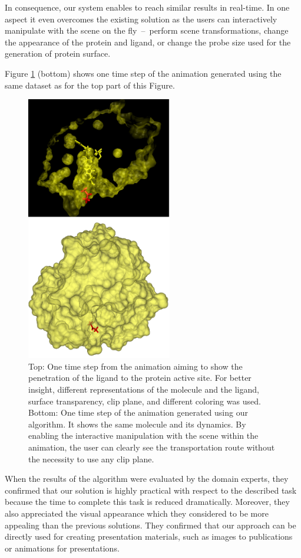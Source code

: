 In consequence, our system enables to reach similar results in real-time. 
In one aspect it even overcomes the existing solution as the users can interactively manipulate with the scene on the fly~--~perform scene transformations, change the appearance of the protein and ligand, or change the probe size used for the generation of protein surface.

Figure \ref{fig:animation} (bottom) shows one time step of the animation generated using the same dataset as for the top part of this Figure.

\begin{figure}[htb]
  \centering
  \includegraphics[width=2.5in]{image/animation.png}
  \caption{Top: One time step from the animation aiming to show the penetration of the ligand to the protein active site. For better insight, different representations of the molecule and the ligand, surface transparency, clip plane, and different coloring was used. Bottom: One time step of the animation generated using our algorithm. It shows the same molecule and its dynamics. By enabling the interactive manipulation with the scene within the animation, the user can clearly see the transportation route without the necessity to use any clip plane.}
	\label{fig:animation}
\end{figure}

When the results of the algorithm were evaluated by the domain experts, they confirmed that our solution is highly practical with respect to the described task because the time to complete this task is reduced dramatically.
Moreover, they also appreciated the visual appearance which they considered to be more appealing than the previous solutions.
They confirmed that our approach can be directly used for creating presentation materials, such as images to publications or animations for presentations.

